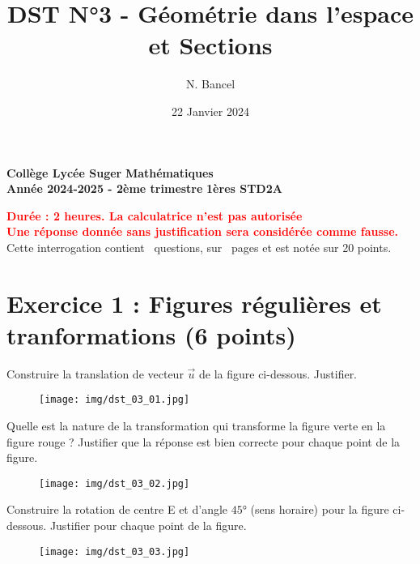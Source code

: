 \documentclass[answers]{exam}
\title{DST N°3 - Géométrie dans l'espace et Sections}
\author{N. Bancel}
\date{22 Janvier 2024}
\begin{document}
\textbf{Collège Lycée Suger}
\hfill
\textbf{Mathématiques} \\

\textbf{Année 2024-2025 - 2ème trimestre}
\hfill
\textbf{1ères STD2A} \par

{\let\newpage\relax\maketitle}

\begin{center}
\textbf{\textcolor{red}{Durée : 2 heures. La calculatrice n'est pas autorisée}} \\
\textbf{\textcolor{red}{Une réponse donnée sans justification sera considérée comme fausse.}} \\
Cette interrogation contient \numquestions\ questions, sur \numpages\ pages et est notée sur 20 points. 

\end{center}

\section*{Exercice 1 : Figures régulières et tranformations (6 points)}


\vspace{1em}

\begin{questions}
  \question[2] Construire la translation de vecteur $\overrightarrow{u}$ de la figure ci-dessous. Justifier.
  \begin{figure}[H]
    \centering
    \texttt{[image: img/dst\_03\_01.jpg]}
  \end{figure}

  \question[2] Quelle est la nature de la transformation qui transforme la figure verte en la figure rouge ? Justifier que la réponse est bien correcte pour chaque point de la figure. 

  \begin{figure}[H]
    \centering
    \texttt{[image: img/dst\_03\_02.jpg]}
  \end{figure}

  \question[2] Construire la rotation de centre E et d’angle $45°$ (sens horaire) pour la figure ci-dessous. Justifier pour chaque point de la figure.

  \begin{figure}[H]
    \centering
    \texttt{[image: img/dst\_03\_03.jpg]}
  \end{figure}

\end{questions} 
\end{document}
